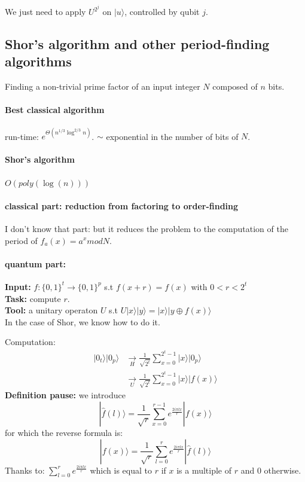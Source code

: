 \documentclass{article}
\begin{document}
We just need to apply $U^{2^j}$ on $|u\rangle$, controlled by qubit $j$.

\subsection{Shor's algorithm and other period-finding algorithms}

Finding a non-trivial prime factor of an input integer $N$ composed 
of $n$ bits. 

\paragraph{Best classical algorithm} run-time: 
$e^{\Theta(n^{1/3}\log^{2/3} n)}$. $\sim$ exponential in the number of bits of $N$.

\paragraph{Shor's algorithm} $O(poly(\log(n)))$

\paragraph{classical part: reduction from factoring to order-finding}
I don't know that part: but it reduces the problem to the computation
of the period of $f_a(x)=a^x mod N$.

\paragraph{quantum part: }
\textbf{Input:} $f:\{0,1\}^{t}\rightarrow \{0,1\}^{p}$ s.t
$f(x+r)=f(x)$ with $0<r<2^t$\\
\textbf{Task:} compute $r$.\\
\textbf{Tool:} a unitary operaton $U$ s.t $U|x\rangle|y\rangle = |x\rangle
|y\oplus f(x)\rangle$\\
In the case of Shor, we know how to do it.

Computation:
\begin{align*}
    |0_t\rangle|0_p\rangle &\xrightarrow[H]{} \frac{1}{\sqrt{2^t}} \sum_{x=0}^{2^t-1} |x\rangle|0_p\rangle \\
    &\xrightarrow[U]{} \frac{1}{\sqrt{2^t}}\sum_{x=0}^{2^t-1} |x\rangle|f(x)\rangle
\end{align*}
\textbf{Definition pause: } we introduce $$|\hat{f}(l)\rangle = \frac{1}{\sqrt{r}} \sum_{x=0}^{r-1} e^{\frac{2i\pi l x}{r}} |f(x)\rangle $$
for which the reverse formula is:
$$|f(x)\rangle = \frac{1}{\sqrt{r}} \sum_{l=0}^{r} e^{\frac{2i\pi lx}{r}} |\hat{f}(l)\rangle  $$
Thanks to: 
$\sum_{l=0}^{r} e^{\frac{2i\pi l x}{r}}$ which is equal to $r$ if $x$ is a multiple of $r$ and $0$ otherwise.
\end{document}
